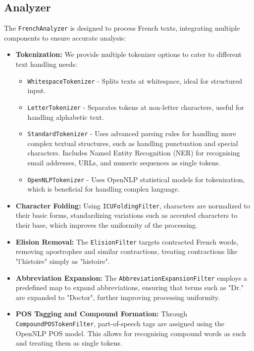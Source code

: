 \subsection{Analyzer}
The \texttt{FrenchAnalyzer} is designed to process French texts, integrating multiple components to ensure accurate analysis:

\begin{itemize}
    \item \textbf{Tokenization:} We provide multiple tokenizer options to cater to different text handling needs:
    \begin{itemize}
        \item \texttt{WhitespaceTokenizer} - Splits texts at whitespace, ideal for structured input.
        \item \texttt{LetterTokenizer} - Separates tokens at non-letter characters, useful for handling alphabetic text.
        \item \texttt{StandardTokenizer} - Uses advanced parsing rules for handling more complex textual structures, such as handling punctuation and special characters. Includes Named Entity Recognition (NER) for recognising email addresses, URLs, and numeric sequences as single tokens. 
        \item \texttt{OpenNLPTokenizer} - Uses OpenNLP statistical models for tokenization, which is beneficial for handling complex language.
    \end{itemize}

    \item \textbf{Character Folding:} Using \texttt{ICUFoldingFilter}, characters are normalized to their basic forms, standardizing variations such as accented characters to their base, which improves the uniformity of the processing.

    \item \textbf{Elision Removal:} The \texttt{ElisionFilter} targets contracted French words, removing apostrophes and similar contractions, treating contractions like "l'histoire" simply as "histoire".

    \item \textbf{Abbreviation Expansion:} The \texttt{AbbreviationExpansionFilter} employs a predefined map to expand abbreviations, ensuring that terms such as "Dr." are expanded to "Doctor", further improving processing uniformity.

    \item \textbf{POS Tagging and Compound Formation:} Through \texttt{CompoundPOSTokenFilter}, part-of-speech tags are assigned using the OpenNLP POS model. This allows for recognising compound words as such and treating them as single tokens.


\end{itemize}
